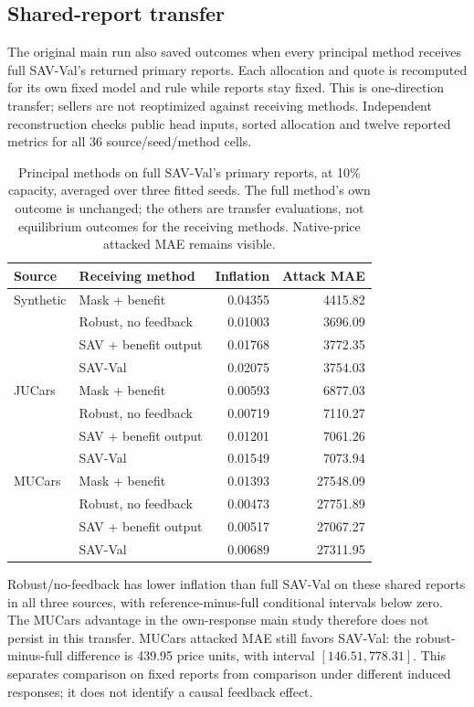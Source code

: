 \documentclass[10pt,journal]{IEEEtran}
\begin{document}
\subsection{Shared-report transfer}
The original main run also saved outcomes when every principal method
receives full SAV-Val's returned primary reports. Each allocation and quote
is recomputed for its own fixed model and rule while reports stay fixed.
This is one-direction transfer; sellers are not reoptimized against receiving
methods. Independent reconstruction checks public head inputs, sorted
allocation and twelve reported metrics for all 36 source/seed/method cells.

\begin{table}[t]
\centering
\caption{Principal methods on full SAV-Val's primary reports, at 10\%
capacity, averaged over three fitted seeds. The full method's own outcome
is unchanged; the others are transfer evaluations, not equilibrium outcomes
for the receiving methods. Native-price attacked MAE remains visible.}
\label{tab:shared_reports}
\begin{tabular}{llrr}
\toprule
Source & Receiving method & Inflation & Attack MAE\\
\midrule
Synthetic & Mask + benefit & 0.04355 & 4415.82\\
 & Robust, no feedback & 0.01003 & 3696.09\\
 & SAV + benefit output & 0.01768 & 3772.35\\
 & SAV-Val & 0.02075 & 3754.03\\
\midrule
JUCars & Mask + benefit & 0.00593 & 6877.03\\
 & Robust, no feedback & 0.00719 & 7110.27\\
 & SAV + benefit output & 0.01201 & 7061.26\\
 & SAV-Val & 0.01549 & 7073.94\\
\midrule
MUCars & Mask + benefit & 0.01393 & 27548.09\\
 & Robust, no feedback & 0.00473 & 27751.89\\
 & SAV + benefit output & 0.00517 & 27067.27\\
 & SAV-Val & 0.00689 & 27311.95\\
\bottomrule
\end{tabular}
\end{table}

Robust/no-feedback has lower inflation than full SAV-Val on these shared
reports in all three sources, with reference-minus-full conditional intervals
below zero. The MUCars advantage in the own-response main study therefore
does not persist in this transfer. MUCars attacked MAE still favors SAV-Val:
the robust-minus-full difference is 439.95 price units, with interval
$[146.51,778.31]$. This separates comparison on fixed reports from comparison
under different induced responses; it does not identify a causal feedback effect.
\end{document}
